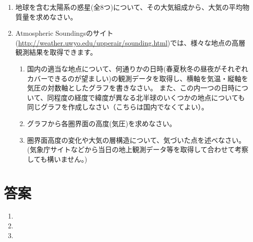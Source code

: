 \documentclass{jsarticle}
\newenvironment{problems}
{
  \renewcommand\labelenumi{\doublebox{\arabic{enumi}}}
  \begin{enumerate}
}{
  \end{enumerate}
  \renewcommand\labelenumi{\arabic{enumi}.}
}
\begin{document}
\begin{problems}
        \begin{enumerate}[(1)]
        \item 文中の空欄(A)〜(G)に当てはまる語句や数値を答えなさい。
        \item 下線部(a)のように、(C)が緯度や年単位・日単位で変動するのは何故か説明しなさい。
        \item 下線部(b)については、エアコン等の冷媒として使われたフロンガスが原因とされますが、実際にはそれ以外の物質も多くあり、いずれも触媒の役割を果たします。
              破壊はオゾンが酸素になることにより起きますが、その化学反応式を答えなさい。
        \item 下線部(c)に関連して、この高度では一般にやけどしないが、なぜか答えなさい。
        \item 下線部(d)について、この層がどのような役割を果たして電波が遠くまで伝わるのか、その理由を述べなさい。\\
        \end{enumerate}

    \item 地球を含む太陽系の惑星(全8つ)について、その大気組成から、大気の平均物質量を求めなさい。\\

    \item Atmospheric Soundingsのサイト(\url{http://weather.uwyo.edu/upperair/sounding.html})では、様々な地点の高層観測結果を取得できます。
        \begin{enumerate}[(1)]
        \item 国内の適当な地点について、何通りかの日時(春夏秋冬の昼夜がそれぞれカバーできるのが望ましい)の観測データを取得し、横軸を気温・縦軸を気圧の対数軸としたグラフを書きなさい。
            また、この内一つの日時について、同程度の経度で緯度が異なる北半球のいくつかの地点についても同じグラフを作成しなさい（こちらは国内でなくてよい）。
        \item グラフから各圏界面の高度(気圧)を求めなさい。
        \item 圏界面高度の変化や大気の層構造について、気づいた点を述べなさい。(気象庁サイトなどから当日の地上観測データ等を取得して合わせて考察しても構いません。)
        \end{enumerate}
\end{problems}

\section{答案}
\begin{problems}
\item 

\item 

\item 

\end{problems}
\end{document}
